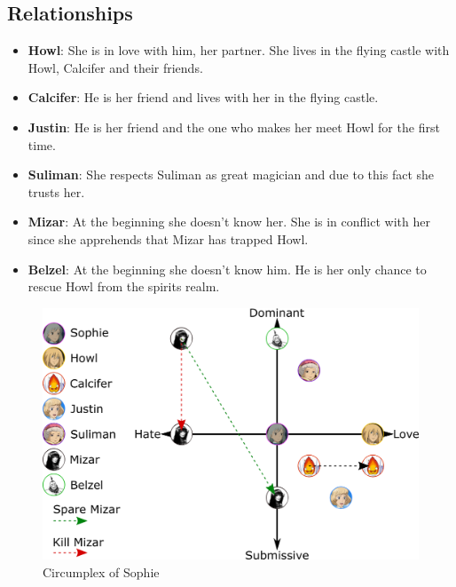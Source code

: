 \subsection{Relationships}
\begin{itemize}
\item \textbf{Howl}: She is in love with him, her partner. She lives in the flying castle with Howl, Calcifer and their friends.
\item \textbf{Calcifer}: He is her friend and lives with her in the flying castle.
\item \textbf{Justin}: He is her friend and the one who makes her meet Howl for the first time.
\item \textbf{Suliman}: She respects Suliman as great magician and due to this fact she trusts her.
\item \textbf{Mizar}: At the beginning she doesn’t know her. She is in conflict with her since she apprehends that Mizar has trapped Howl.
\item \textbf{Belzel}: At the beginning she doesn’t know him. He is her only chance to rescue Howl from the spirits realm.
\end{itemize}

\begin{figure}[H]
  \centering
  \includegraphics[width=14cm]{Images/Diagrams/Circumplexes/sophieCircumplex}
  \caption{Circumplex of Sophie}
\end{figure}

